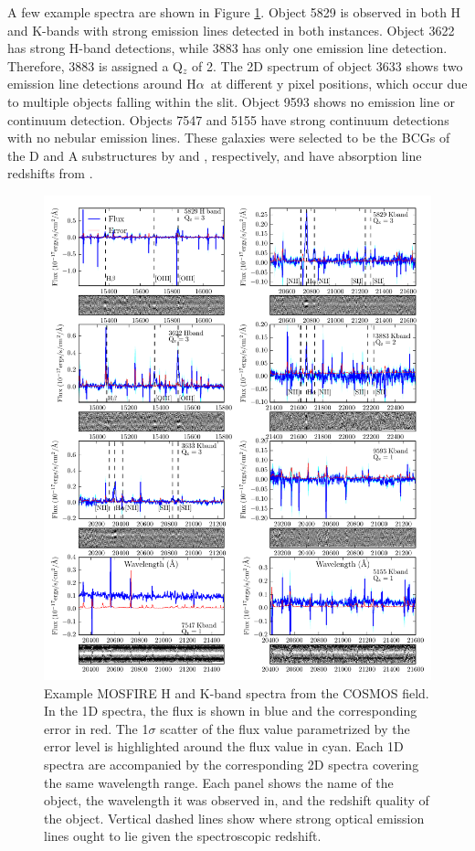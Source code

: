 \documentclass[iop]{emulateapj}
\newcommand{\Halpha}{H$\alpha$}
\begin{document}
A few example spectra are shown in Figure \ref{fig:spectra}. Object 5829 is observed in both H and K-bands with strong emission lines detected in both instances. Object 3622 has strong H-band detections, while 3883 has only one emission line detection. Therefore, 3883 is assigned a Q$_z$ of 2. The 2D spectrum of object 3633 shows two emission line detections around \Halpha\ at different y pixel positions, which occur due to multiple objects falling within the slit. Object 9593 shows no emission line or continuum detection.
Objects 7547 and 5155 have strong continuum detections with no nebular emission lines. These galaxies were selected to be the BCGs of the D and A substructures by \citet{Yuan2014} and \citet{Spitler2012}, respectively, and have absorption line redshifts from \citet{Belli2014}. 



\begin{figure}
\includegraphics[scale=0.85]{figures/spectra.pdf}
\caption{Example MOSFIRE H and K-band spectra from the COSMOS field. 
In the 1D spectra, the flux is shown in blue and the corresponding error in red. The 1$\sigma$ scatter of the flux value parametrized by the error level is highlighted around the flux value in cyan.
Each 1D spectra are accompanied by the corresponding 2D spectra covering the same wavelength range. 
Each panel shows the name of the object, the wavelength it was observed in, and the redshift quality of the object. Vertical dashed lines show where strong optical emission lines ought to lie given the spectroscopic redshift.}
\label{fig:spectra}
\end{figure}
\end{document}
